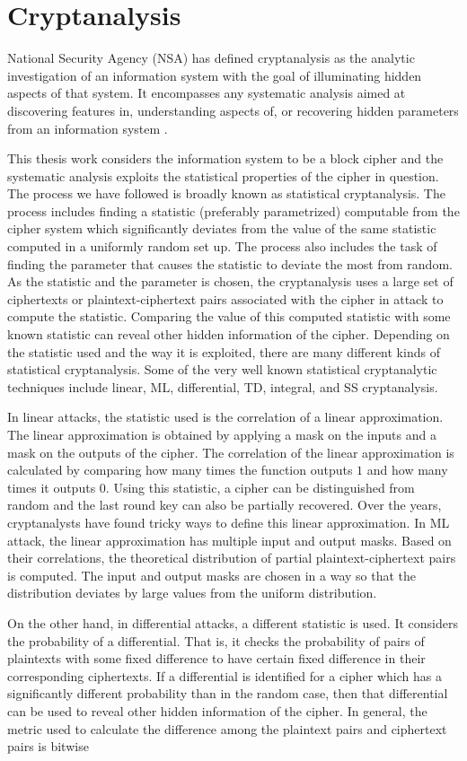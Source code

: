 \section{Cryptanalysis} \label{section:cryptanalysis}
National Security Agency (NSA) has defined cryptanalysis as the analytic investigation of an information system with the goal of illuminating hidden aspects of that system. It encompasses any systematic analysis aimed at discovering features in, understanding aspects of, or recovering hidden parameters from an information system \cite{def_cryptanalysis}.\par \noindent This thesis work considers the information system to be a block cipher and the systematic analysis exploits the statistical properties of the cipher in question. The process we have followed is broadly known as statistical cryptanalysis. The process includes finding a statistic (preferably parametrized) computable from the cipher system which significantly deviates from the value of the same statistic computed in a uniformly random set up. The process also includes the task of finding the parameter that causes the statistic to deviate the most from random. As the statistic and the parameter is chosen, the cryptanalysis uses a large set of ciphertexts or plaintext-ciphertext pairs associated with the cipher in attack to compute the statistic. Comparing the value of this computed statistic with some known statistic can reveal other hidden information of the cipher. Depending on the statistic used and the way it is exploited, there are many different kinds of statistical cryptanalysis. Some of the very well known statistical cryptanalytic techniques include linear, ML, differential, TD, integral, and SS cryptanalysis. \par \noindent In linear attacks, the statistic used is the correlation of a linear approximation. The linear approximation is obtained by applying a mask on the inputs and a mask on the outputs of the cipher. The correlation of the linear approximation is calculated by comparing how many times the function outputs $1$ and how many times it outputs $0$. Using this statistic, a cipher can be distinguished from random and the last round key can also be partially recovered. Over the years, cryptanalysts have found tricky ways to define this linear approximation. In ML attack, the linear approximation has multiple input and output masks. Based on their correlations, the theoretical distribution of partial plaintext-ciphertext pairs is computed. The input and output masks are chosen in a way so that the distribution deviates by large values from the uniform distribution. \par \noindent On the other hand, in differential attacks, a different statistic is used. It considers the probability of a differential. That is, it checks the probability of pairs of plaintexts with some fixed difference to have certain fixed difference in their corresponding ciphertexts. If a differential is identified for a cipher which has a significantly different probability than in the random case, then that differential can be used to reveal other hidden information of the cipher. In general, the metric used to calculate the difference among the plaintext pairs and ciphertext pairs is bitwise 